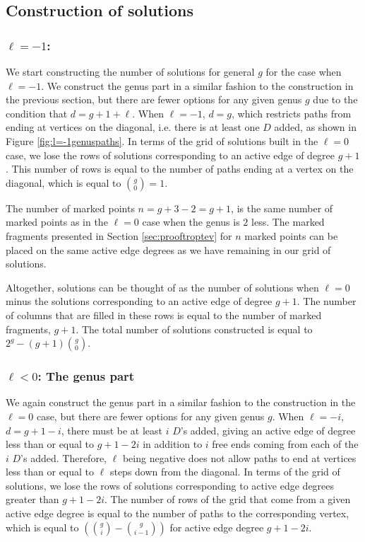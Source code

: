 \documentclass[11pt,reqno]{amsart}
\theoremstyle{definition}
\begin{document}
\subsection{Construction of solutions}
\subsubsection*{$\ell=-1$:}
We start constructing the number of solutions for general $g$ for the case when $\ell=-1$. We construct the genus part in a similar fashion to the construction in the previous section, but there are fewer options for any given genus $g$ due to the condition that $d=g+1+\ell$. When $\ell=-1$, $d=g$, which restricts paths from ending at vertices on the diagonal, i.e. there is at least one $D$ added, as shown in Figure \ref{fig:l=-1genuspaths}. In terms of the grid of solutions built in the $\ell=0$ case, we lose the rows of solutions corresponding to an active edge of degree $g+1$. This number of rows is equal to the number of paths ending at a vertex on the diagonal, which is equal to ${g\choose0}=1$. 

The number of marked points $n=g+3-2=g+1$, is the same number of marked points as in the $\ell=0$ case when the genus is $2$ less. The marked fragments presented in Section \ref{sec:prooftroptev} for $n$ marked points can be placed on the same active edge degrees as we have remaining in our grid of solutions. 

Altogether, solutions can be thought of as the number of solutions when $\ell=0$ minus the solutions corresponding to an active edge of degree $g+1$. The number of columns that are filled in these rows is equal to the number of marked fragments, $g+1$. The total number of solutions constructed is equal to $2^g-(g+1){g\choose0}$.

\subsubsection*{$\ell<0$: The genus part}
We again construct the genus part in a similar fashion to the construction in the $\ell=0$ case, but there are fewer options for any given genus $g$. When $\ell=-i$, $d=g+1-i$, there must be at least $i$ $D$'s added, giving an active edge of degree less than or equal to $g+1-2i$ in addition to $i$ free ends coming from each of the $i$ $D$'s added. Therefore, $\ell $ being negative does not allow paths to end at vertices less than or equal to $\ell$ steps down from the diagonal. In terms of the grid of solutions, we lose the rows of solutions corresponding to active edge degrees greater than $g+1-2i$. The number of rows of the grid that come from a given active edge degree is equal to the number of paths to the corresponding vertex, which is equal to $({g\choose{i}}-{g\choose{i-1}})$ for active edge degree $g+1-2i$.
\end{document}
